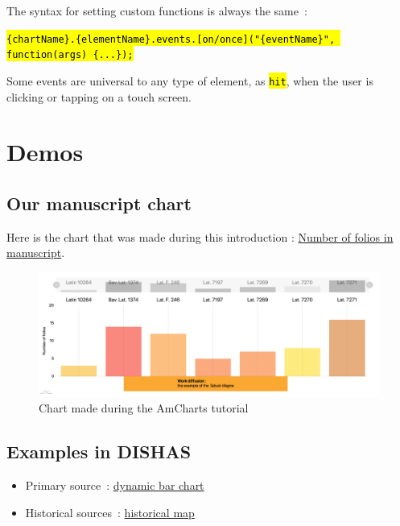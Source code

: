 \documentclass[a4paper,12pt,twoside]{book}
\newcommand{\clearemptydoublepage}{\newpage{\pagestyle{empty}\cleardoublepage}}
\let\OldTexttt\texttt
\renewcommand{\texttt}[1]{\OldTexttt{\hl{#1}}}
\begin{document}
The syntax for setting custom functions is always the same~:

\texttt{\{chartName\}.\{elementName\}.events.{[}on/once{]}("\{eventName\}", function(args) \{...\});}

Some events are universal to any type of element, as \texttt{hit}, when the user is clicking or tapping on a touch screen.

		\section{Demos}\label{demos}

			\subsection{Our manuscript chart}\label{our-manuscript-chart}

Here is the chart that was made during this introduction : \href{https://codepen.io/segolene-albouy/pen/LwRBdg}{Number of folios in manuscript}.

\begin{figure}[H]
	\centering
	\includegraphics[width=15cm]{Images/Visualisations/Chart-tutoriel.png}
	\caption{Chart made during the AmCharts tutorial}
\end{figure}

			\subsection{Examples in DISHAS}\label{examples-in-dishas}

\begin{itemize}
	\item Primary source~: \href{https://codepen.io/segolene-albouy/pen/rExamo}{dynamic bar chart}
	\item Historical sources~: \href{https://codepen.io/segolene-albouy/pen/KOKBwL}{historical map}
\end{itemize}

\clearemptydoublepage

	\printacronyms[title=Liste des acronymes,toctitle=Acronymes]
	
	\backmatter
	\listoffigures
	\tableofcontents
	
\end{document}
